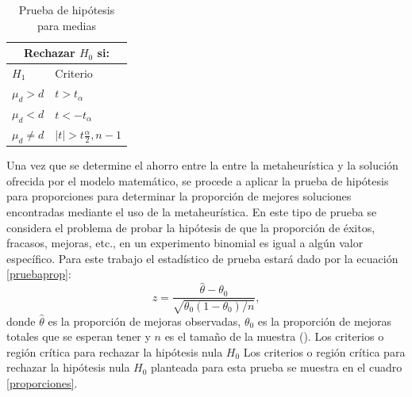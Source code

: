 \documentclass[preprint,12pt, pdftex]{elsarticle}
\begin{document}
\begin{table}[htp]
\caption{Prueba de hipótesis para medias}
\centering
\begin{tabular}{l|l}
\hline
\multicolumn{2}{c}{Rechazar $H_{0}$ si:}                                                                           \\ \hline
$H_{1}$          & \multicolumn{1}{l}{Criterio}                                                                     \\ \hline
$\mu_{d} > d$    & $t > t_{\alpha}$                                                                                  \\ \hline
$\mu_{d} < d$    & $t < -t_{\alpha}$                                                                                 \\ \hline
$\mu_{d} \not= d$ & \multicolumn{1}{c}{$|t| > t \frac{\alpha}{2}, n-1$} \\ \hline
\end{tabular}
\label{medias}
\end{table}

Una vez que se determine el ahorro entre la entre la metaheurística y la solución ofrecida por el modelo matemático, se procede a aplicar la prueba de hipótesis para proporciones para determinar la proporción de mejores soluciones encontradas mediante el uso de la metaheurística. En este tipo de prueba se considera el problema de probar la hipótesis de que la proporción de éxitos, fracasos, mejoras, etc., en un experimento binomial es igual a algún valor específico. Para este trabajo el estadístico de prueba estará dado por la ecuación \ref{pruebaprop}:
\begin{equation} \label{pruebaprop}
    z = \frac{\hat{\theta} - \theta_{0}}{\sqrt{\theta_{0}(1-\theta_{0})/n}},
\end{equation}
donde $\hat{\theta}$ es la proporción de mejoras observadas, $\theta_{0}$ es la proporción de mejoras totales que se esperan tener y $n$ es el tamaño de la muestra (\citet{walpole}). Los criterios o región crítica para rechazar la hipótesis nula $H_{0}$ Los criterios o región crítica para rechazar la hipótesis nula $H_{0}$ planteada para esta prueba se muestra en el cuadro \ref{proporciones}.
\end{document}
